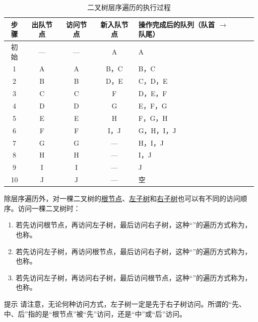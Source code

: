 \begin{table}[htbp]
    \centering
    \caption{二叉树层序遍历的执行过程}
    \label{tab:layer-order-traversal}
    \begin{tabular}{c|c|c|c|l}
        \hline
        步骤 & 出队节点 & 访问节点 & 新入队节点
        & 操作完成后的队列（队首 $\rightarrow$ 队尾） \\
        \hline
        初始 & --- & --- & A & A \\
        1 & A & A & B，C & B，C \\
        2 & B & B & D，E & C，D，E \\
        3 & C & C & F & D，E，F \\
        4 & D & D & G & E，F，G \\
        5 & E & E & H & F，G，H \\
        6 & F & F & I，J & G，H，I，J \\
        7 & G & G & --- & H，I，J \\
        8 & H & H & --- & I，J \\
        9 & I & I & --- & J \\
        10 & J & J & --- & 空 \\
        \hline
    \end{tabular}
\end{table}

除层序遍历外，对一棵二叉树的\uline{根节点}、\uline{左子树}和\uline{右子树}也可以有不同的访问顺序。访问一棵二叉树时：
\begin{enumerate}
    \item 若先访问根节点，再访问左子树，最后访问右子树，这种“”的遍历方式称为，也称。
    \item 若先访问左子树，再访问根节点，最后访问右子树，这种“”的遍历方式称为，也称。
    \item 若先访问左子树，再访问右子树，最后访问根节点，这种“”的遍历方式称为，也称。
\end{enumerate}

\begin{notebox}{提示}
    请注意，无论何种访问方式，左子树一定是先于右子树访问。所谓的“先、中、后”指的是“根节点”被“先”访问，还是“中”或“后”访问。
\end{notebox}

